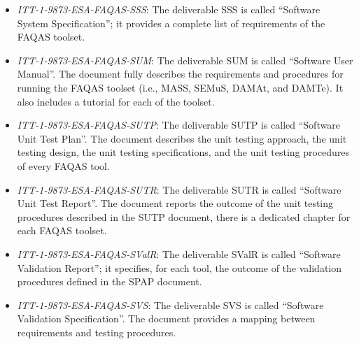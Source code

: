 \begin{itemize}
	\item \emph{ITT-1-9873-ESA-FAQAS-SSS}: The deliverable SSS is called ``Software System Specification''; it provides a complete list of requirements of the FAQAS toolset.

	\item \emph{ITT-1-9873-ESA-FAQAS-SUM}: The deliverable SUM is called ``Software User Manual''. The document fully describes the requirements and procedures for running the FAQAS toolset (i.e., MASS, SEMuS, DAMAt, and DAMTe). It also includes a tutorial for each of the toolset.

	\item \emph{ITT-1-9873-ESA-FAQAS-SUTP}: The deliverable SUTP is called ``Software Unit Test Plan''. The document describes the unit testing approach, the unit testing design, the unit testing specifications, and the unit testing procedures of every FAQAS tool.

	\item \emph{ITT-1-9873-ESA-FAQAS-SUTR}: The deliverable SUTR is called ``Software Unit Test Report''. The document reports the outcome of the unit testing procedures described in the SUTP document, there is a dedicated chapter for each FAQAS toolset.

	\item \emph{ITT-1-9873-ESA-FAQAS-SValR}: The deliverable SValR is called ``Software Validation Report''; it specifies, for each tool, the outcome of the validation procedures defined in the SPAP document.

	\item \emph{ITT-1-9873-ESA-FAQAS-SVS}: The deliverable SVS is called ``Software Validation Specification''. The document provides a mapping between requirements and testing procedures.
\end{itemize}



